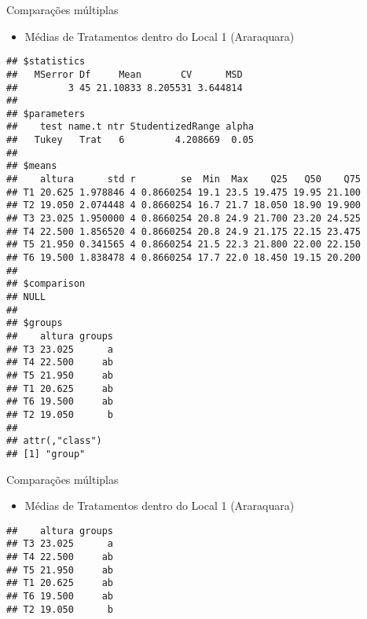 \documentclass[
  ignorenonframetext,
]{beamer}
\providecommand{\tightlist}{%
  \setlength{\itemsep}{0pt}\setlength{\parskip}{0pt}}
\begin{document}
\begin{frame}[fragile]{Comparações múltiplas}
\protect\hypertarget{comparauxe7uxf5es-muxfaltiplas-1}{}
\begin{itemize}
\tightlist
\item
  Médias de Tratamentos dentro do Local 1 (Araraquara)
\end{itemize}

\begin{verbatim}
## $statistics
##   MSerror Df     Mean       CV      MSD
##         3 45 21.10833 8.205531 3.644814
## 
## $parameters
##    test name.t ntr StudentizedRange alpha
##   Tukey   Trat   6         4.208669  0.05
## 
## $means
##    altura      std r        se  Min  Max    Q25   Q50    Q75
## T1 20.625 1.978846 4 0.8660254 19.1 23.5 19.475 19.95 21.100
## T2 19.050 2.074448 4 0.8660254 16.7 21.7 18.050 18.90 19.900
## T3 23.025 1.950000 4 0.8660254 20.8 24.9 21.700 23.20 24.525
## T4 22.500 1.856520 4 0.8660254 20.8 24.9 21.175 22.15 23.475
## T5 21.950 0.341565 4 0.8660254 21.5 22.3 21.800 22.00 22.150
## T6 19.500 1.838478 4 0.8660254 17.7 22.0 18.450 19.15 20.200
## 
## $comparison
## NULL
## 
## $groups
##    altura groups
## T3 23.025      a
## T4 22.500     ab
## T5 21.950     ab
## T1 20.625     ab
## T6 19.500     ab
## T2 19.050      b
## 
## attr(,"class")
## [1] "group"
\end{verbatim}
\end{frame}

\begin{frame}[fragile]{Comparações múltiplas}
\protect\hypertarget{comparauxe7uxf5es-muxfaltiplas-2}{}
\begin{itemize}
\tightlist
\item
  Médias de Tratamentos dentro do Local 1 (Araraquara)
\end{itemize}

\begin{verbatim}
##    altura groups
## T3 23.025      a
## T4 22.500     ab
## T5 21.950     ab
## T1 20.625     ab
## T6 19.500     ab
## T2 19.050      b
\end{verbatim}
\end{frame}
\end{document}
